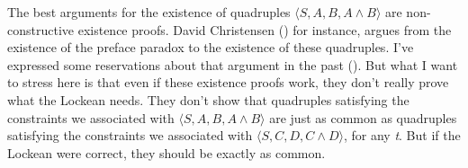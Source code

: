 \documentclass[
  10pt,
  letterpaper,
  DIV=11,
  numbers=noendperiod,
  twoside]{scrartcl}
\begin{document}
The best arguments for the existence of quadruples
\(\langle S, A, B, A \wedge B \rangle\) are non-constructive existence
proofs. David Christensen () for
instance, argues from the existence of the preface paradox to the
existence of these quadruples. I've expressed some reservations about
that argument in the past
(). But what I want
to stress here is that even if these existence proofs work, they don't
really prove what the Lockean needs. They don't show that quadruples
satisfying the constraints we associated with
\(\langle S, A, B, A \wedge B \rangle\) are just as common as quadruples
satisfying the constraints we associated with
\(\langle S, C, D, C \wedge D \rangle\), for any \emph{t}. But if the
Lockean were correct, they should be exactly as common.
\end{document}
